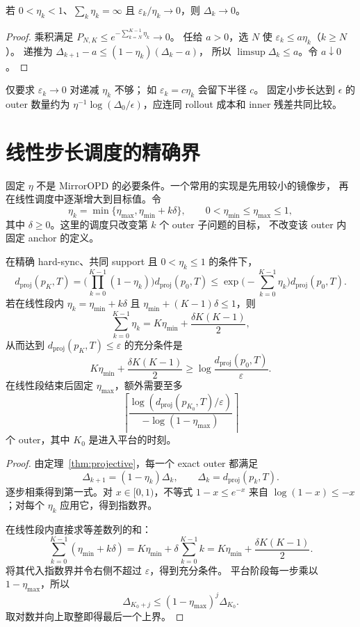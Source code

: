 \begin{corollary}
若 $0<\eta_k<1$、$\sum_k\eta_k=\infty$ 且
$\varepsilon_k/\eta_k\to0$，则 $\Delta_k\to0$。
\end{corollary}
\begin{proof}
乘积满足 $P_{N,K}\le e^{-\sum_{k=N}^{K-1}\eta_k}\to0$。
任给 $a>0$，选 $N$ 使 $\varepsilon_k\le a\eta_k$（$k\ge N$）。
递推为 $\Delta_{k+1}-a\le(1-\eta_k)(\Delta_k-a)$，
所以 $\limsup\Delta_k\le a$。令 $a\downarrow0$。
\end{proof}
仅要求 $\varepsilon_k\to0$ 对递减 $\eta_k$ 不够；
如 $\varepsilon_k=c\eta_k$ 会留下半径 $c$。
固定小步长达到 $\epsilon$ 的 outer 数量约为
$\eta^{-1}\log(\Delta_0/\epsilon)$，应连同 rollout 成本和 inner 残差共同比较。

\section{线性步长调度的精确界}
固定 $\eta$ 不是 MirrorOPD 的必要条件。一个常用的实现是先用较小的镜像步，
再在线性调度中逐渐增大到目标值。令
\[
 \eta_k=\min\{\eta_{\max},\eta_{\min}+k\delta\},
 \qquad 0<\eta_{\min}\le\eta_{\max}\le1,
\]
其中 $\delta\ge0$。这里的调度只改变第 $k$ 个 outer 子问题的目标，
不改变该 outer 内固定 anchor 的定义。

\begin{theorem}[线性调度的乘积收缩与复杂度]
\label{thm:linear-schedule}
在精确 hard-sync、共同 support 且 $0<\eta_k\le1$ 的条件下，
\[
 d_{\mathrm{proj}}(p_K,T)
 =\Big(\prod_{k=0}^{K-1}(1-\eta_k)\Big)d_{\mathrm{proj}}(p_0,T)
 \le \exp\!\Big(-\sum_{k=0}^{K-1}\eta_k\Big)d_{\mathrm{proj}}(p_0,T).
\]
若在线性段内 $\eta_k=\eta_{\min}+k\delta$ 且
$\eta_{\min}+ (K-1)\delta\le1$，则
\[
 \sum_{k=0}^{K-1}\eta_k
 =K\eta_{\min}+\frac{\delta K(K-1)}2,
\]
从而达到 $d_{\mathrm{proj}}(p_K,T)\le\varepsilon$ 的充分条件是
\[
 K\eta_{\min}+\frac{\delta K(K-1)}2
 \ge\log\frac{d_{\mathrm{proj}}(p_0,T)}\varepsilon.
\]
在线性段结束后固定 $\eta_{\max}$，额外需要至多
\[
 \left\lceil \frac{\log(d_{\mathrm{proj}}(p_{K_0},T)/\varepsilon)}
 {-\log(1-\eta_{\max})}\right\rceil
\]
个 outer，其中 $K_0$ 是进入平台的时刻。
\end{theorem}

\begin{proof}
由定理~\ref{thm:projective}，每一个 exact outer 都满足
\[
 \Delta_{k+1}=(1-\eta_k)\Delta_k,
 \qquad \Delta_k=d_{\mathrm{proj}}(p_k,T).
\]
逐步相乘得到第一式。对 $x\in[0,1)$，不等式
$1-x\le e^{-x}$ 来自 $\log(1-x)\le-x$；对每个 $\eta_k$ 应用它，得到指数界。

在线性段内直接求等差数列的和：
\[
 \sum_{k=0}^{K-1}(\eta_{\min}+k\delta)
 =K\eta_{\min}+\delta\sum_{k=0}^{K-1}k
 =K\eta_{\min}+\frac{\delta K(K-1)}2.
\]
将其代入指数界并令右侧不超过 $\varepsilon$，得到充分条件。
平台阶段每一步乘以 $1-\eta_{\max}$，所以
\[
 \Delta_{K_0+j}\le(1-\eta_{\max})^j\Delta_{K_0}.
\]
取对数并向上取整即得最后一个上界。
\end{proof}

